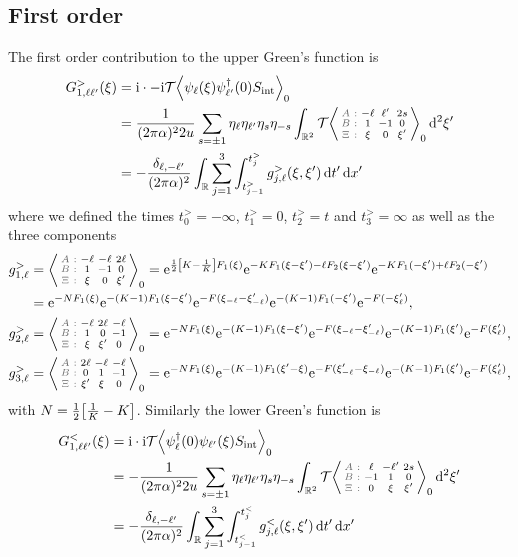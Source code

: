 \documentclass[english, parskip=full]{scrartcl}
\begin{document}
\subsection{First order}
The first order contribution to the upper Green's function is
\begin{align}
G_{1,\ell\ell'}^>(\xi) &= \i \cdot -\i \mathcal{T} \bra*{\psi_{\ell}(\xi) \psi_{\ell'}^\dagger(0) S_\Text{int}}_0\\
&= \frac{1}{(2\pi\alpha)^2 2u} \sum_{s=\pm 1} \eta_{\ell}\eta_{\ell'} \eta_s\eta_{-s} \intrnd{2}{ \mathcal{T} \bra*{ \cabx{-\ell& \ell'& 2s}{1& -1& 0}{\xi& 0& \xi'} }_0 }{\xi'}\\
&= -\frac{\delta_{\ell,-\ell'}}{(2\pi\alpha)^2} \intr{ \sum_{j=1}^3 \intx{t_{j-1}^>}{t_j^>}{g_{j,\ell}^>(\xi,\xi')}{t'} }{x'}
\end{align}
where we defined the times $t_0^> = -\infty$, $t_1^> = 0$, $t_2^> = t$ and $t_3^>=\infty$ as well as the three components
\begin{align}
g_{1,\ell}^> &= \bra*{\cabx{-\ell&-\ell&2\ell}{1&-1&0}{\xi&0&\xi'}}_0 = \powe{\frac{1}{2} \klb*{K - \frac{1}{K}}F_1(\xi)} \powe{-KF_1(\xi-\xi') - \ell F_2(\xi-\xi')} \powe{-KF_1(-\xi') + \ell F_2(-\xi')} \\
&= \powe{-NF_1(\xi)} \powe{-(K-1)F_1(\xi-\xi')} \powe{-F(\xi_{-\ell} - \xi_{-\ell}')} \powe{-(K-1)F_1(-\xi')} \powe{-F(-\xi_\ell')},\\
g_{2,\ell}^> &= \bra*{\cabx{-\ell&2\ell&-\ell}{1&0&-1}{\xi&\xi'&0}}_0 = \powe{-NF_1(\xi)} \powe{-(K-1)F_1(\xi-\xi')} \powe{-F(\xi_{-\ell} - \xi_{-\ell}')} \powe{-(K-1)F_1(\xi')} \powe{-F(\xi_\ell')},\\
g_{3,\ell}^> &= \bra*{\cabx{2\ell&-\ell&-\ell}{0&1&-1}{\xi'&\xi&0}}_0 = \powe{-NF_1(\xi)} \powe{-(K-1)F_1(\xi'-\xi)} \powe{-F(\xi_{-\ell}' - \xi_{-\ell})} \powe{-(K-1)F_1(\xi')} \powe{-F(\xi_\ell')},
\end{align}
with $N = \frac{1}{2}\klb*{\frac{1}{K} - K}$.
Similarly the lower Green's function is
\begin{align}
G_{1,\ell\ell'}^<(\xi) &= \i \cdot \i \mathcal{T} \bra*{\psi_{\ell}^\dagger(0) \psi_{\ell'}(\xi) S_\Text{int}}_0\\
&= -\frac{1}{(2\pi\alpha)^2 2u} \sum_{s=\pm 1} \eta_{\ell} \eta_{\ell'} \eta_s\eta_{-s} \intrnd{2}{ \mathcal{T} \bra*{ \cabx{\ell& -\ell'& 2s}{-1& 1& 0}{0& \xi& \xi'} }_0 }{\xi'}\\
&= -\frac{\delta_{\ell,-\ell'}}{(2\pi\alpha)^2} \intr{ \sum_{j=1}^3 \intx{t_{j-1}^<}{t_j^<}{g_{j,\ell}^<(\xi,\xi')}{t'} }{x'}
\end{align}
\end{document}
